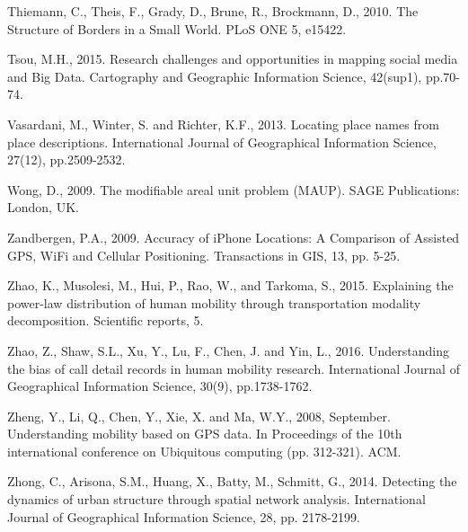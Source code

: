 \documentclass[]{tGIS2e}
\begin{document}
\begin{thebibliography}{9}
Thiemann, C., Theis, F., Grady, D., Brune, R., Brockmann, D., 2010. The Structure of Borders in a Small World. PLoS ONE 5, e15422.

Tsou, M.H., 2015. Research challenges and opportunities in mapping social media and Big Data. Cartography and Geographic Information Science, 42(sup1), pp.70-74.

Vasardani, M., Winter, S. and Richter, K.F., 2013. Locating place names from place descriptions. International Journal of Geographical Information Science, 27(12), pp.2509-2532.

Wong, D., 2009. The modifiable areal unit problem (MAUP). SAGE Publications: London, UK.

Zandbergen, P.A., 2009. Accuracy of iPhone Locations: A Comparison of Assisted GPS, WiFi and Cellular Positioning. Transactions in GIS, 13, pp. 5-25.

Zhao, K., Musolesi, M., Hui, P., Rao, W., and Tarkoma, S., 2015. Explaining the power-law distribution of human mobility through transportation modality decomposition. Scientific reports, 5.

Zhao, Z., Shaw, S.L., Xu, Y., Lu, F., Chen, J. and Yin, L., 2016. Understanding the bias of call detail records in human mobility research. International Journal of Geographical Information Science, 30(9), pp.1738-1762.

Zheng, Y., Li, Q., Chen, Y., Xie, X. and Ma, W.Y., 2008, September. Understanding mobility based on GPS data. In Proceedings of the 10th international conference on Ubiquitous computing (pp. 312-321). ACM.

Zhong, C., Arisona, S.M., Huang, X., Batty, M., Schmitt, G., 2014. Detecting the dynamics of urban structure through spatial network analysis. International Journal of Geographical Information Science, 28, pp. 2178-2199.
\end{thebibliography}


%




\label{lastpage}
\end{document}

